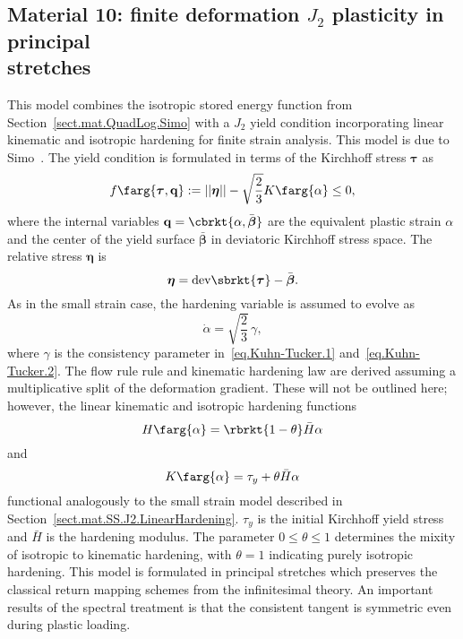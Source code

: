 \subsection[Material 10: finite deformation $J_{2}$ plasticity in 
principal stretches]
{Material 10: finite deformation $J_{2}$ plasticity in 
principal\\ stretches}
\label{sect.mat.J2.QL.LinearHardening}
This model combines the isotropic stored energy function from 
Section~\ref{sect.mat.QuadLog.Simo} with
a $J_{2}$ yield condition incorporating
linear kinematic and 
isotropic hardening for finite strain analysis. 
This model is due to Simo~\cite{Simo1992}.
The yield condition is formulated in terms of the
Kirchhoff stress $\boldsymbol{\tau}$ as
\begin{equation}
	f\farg{\boldsymbol{\tau}, \mathbf{q}} := 
	||\boldsymbol{\eta}|| 
	- \sqrt{\frac{2}{3}} K\farg{\alpha} \le 0,
\end{equation}
where the internal variables 
$\mathbf{q} = \cbrkt{\alpha, \bar{\boldsymbol{\beta}}}$ are
the equivalent plastic strain $\alpha$ and the center of
the yield surface $\bar{\boldsymbol{\beta}}$ in deviatoric
Kirchhoff stress space. The relative stress $\boldsymbol{\eta}$ is
\begin{equation}
\boldsymbol{\eta} = \textrm{dev}\sbrkt{\boldsymbol\tau} - 
\bar{\boldsymbol{\beta}}.
\end{equation}
As in the small strain case, the hardening variable is assumed
to evolve as
\begin{equation}
\dot{\alpha} = \sqrt{\frac{2}{3}}\,\gamma,	
\end{equation}
where $\gamma$ is the consistency parameter 
in~\eqref{eq.Kuhn-Tucker.1} and~\eqref{eq.Kuhn-Tucker.2}.
The flow rule rule and kinematic hardening law are derived
assuming a multiplicative split of the deformation gradient.
These will not be outlined here; however,
the linear kinematic and isotropic hardening functions
\begin{equation}
	H\farg{\alpha} = \rbrkt{1 - \theta} \bar{H} \alpha
\end{equation}
and
\begin{equation}
	K\farg{\alpha} = \tau_{y} + \theta \bar{H} \alpha
\end{equation}
functional analogously to the small strain model described
in Section~\ref{sect.mat.SS.J2.LinearHardening}.
$\tau_{y}$ is the initial Kirchhoff yield stress and
$\bar{H}$ is the hardening modulus.
The parameter $0 \le \theta \le 1$ determines the mixity of 
isotropic to kinematic hardening, with $\theta = 1$ indicating purely 
isotropic hardening.
This model is formulated in principal stretches which preserves the 
classical return mapping schemes from the infinitesimal theory. An 
important results of the spectral treatment is that the consistent 
tangent is symmetric even during plastic loading.

